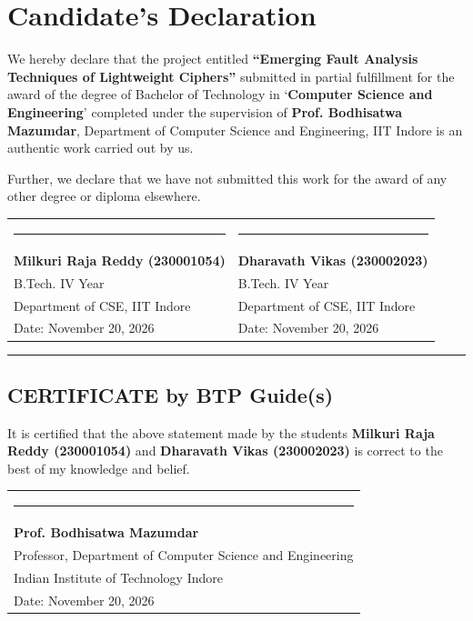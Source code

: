 \chapter*{Candidate's Declaration}

We hereby declare that the project entitled \textbf{``Emerging Fault Analysis Techniques of Lightweight Ciphers''} submitted in partial fulfillment for the award of the degree of Bachelor of Technology in `\textbf{Computer Science and Engineering}' completed under the supervision of \textbf{Prof. Bodhisatwa Mazumdar}, Department of Computer Science and Engineering, IIT Indore is an authentic work carried out by us.

\noindent
Further, we declare that we have not submitted this work for the award of any other degree or diploma elsewhere.

\vspace{2.5cm}
\noindent
\begin{tabular*}{\textwidth}{@{\extracolsep{\fill}}ll}
\rule{6.5cm}{0.4pt} & \rule{6.5cm}{0.4pt} \\
\textbf{Milkuri Raja Reddy (230001054)} & \textbf{Dharavath Vikas (230002023)} \\
B.Tech. IV Year & B.Tech. IV Year \\
Department of CSE, IIT Indore & Department of CSE, IIT Indore \\
Date: November 20, 2026 & Date: November 20, 2026 \\
\end{tabular*}

\vspace{1.5cm}
\noindent
\rule{\textwidth}{1.0pt}
\vspace{0.5cm}

\section*{CERTIFICATE by BTP Guide(s)}

It is certified that the above statement made by the students \textbf{Milkuri Raja Reddy (230001054)} and \textbf{Dharavath Vikas (230002023)} is correct to the best of my knowledge and belief.

\vspace{2.5cm}
\noindent
\begin{tabular}{l}
\rule{7.0cm}{0.4pt} \\
\textbf{Prof. Bodhisatwa Mazumdar} \\
Professor, Department of Computer Science and Engineering \\
Indian Institute of Technology Indore \\
Date: November 20, 2026 \\
\end{tabular}


